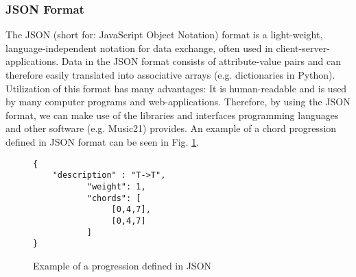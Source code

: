 \subsubsection{JSON Format}
The JSON (short for: JavaScript Object Notation) format \cite{json} is a light-weight, language-independent notation for data exchange, often used in client-server-applications. Data in the JSON format consists of attribute-value pairs and can therefore easily translated into associative arrays (e.g. dictionaries in Python). Utilization of this format has many advantages: It is human-readable and is used by many computer programs and web-applications. Therefore, by using the JSON format, we can make use of the libraries and interfaces programming languages and other software (e.g. Music21) provides. An example of a chord progression defined in JSON format can be seen in Fig. \ref{fig:jsonex}.

\begin{figure}
\centering
\begin{verbatim}
{
	"description" : "T->T",
           "weight": 1,
           "chords": [
                [0,4,7],
                [0,4,7]
           ]
}
\end{verbatim}
\caption{Example of a progression defined in JSON}
\label{fig:jsonex}
\end{figure}
